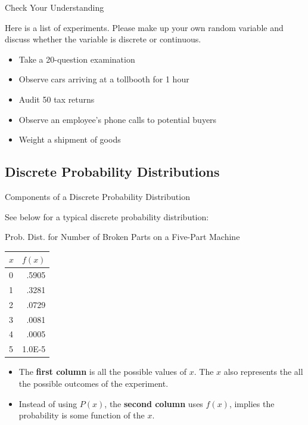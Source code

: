 \documentclass{beamer}
\begin{document}
\begin{frame}{Check Your Understanding}

Here is a list of experiments. Please make up your own random variable and discuss whether the variable is discrete or continuous. 

\begin{itemize}
\item Take a 20-question examination
\item Observe cars arriving at a tollbooth for 1 hour
\item Audit 50 tax returns
\item Observe an employee's phone calls to potential buyers
\item Weight a shipment of goods
\end{itemize}

\end{frame}


\subsection{Discrete Probability Distributions}

\begin{frame}
\subsectionpage
\end{frame}


\begin{frame}{Components of a Discrete Probability Distribution}

See below for a typical discrete probability distribution: 


\begin{center}
Prob. Dist. for Number of Broken Parts on a Five-Part Machine

\vspace{0.2 cm}
\begin{tabular}{l|r} 
\hline
$x$ & $f(x)$  \\ 
\hline
\hline
0     & .5905     \\ 
\hline
1     & .3281     \\ 
\hline
2     & .0729     \\ 
\hline
3     & .0081     \\ 
\hline
4     & .0005     \\ 
\hline
5     & 1.0E-5    \\
\hline
\end{tabular}
\end{center}

\begin{itemize}
\item The \textbf{first column} is all the possible values of $x$. The $x$ also represents the all the possible outcomes of the experiment. 
\item Instead of using $P(x)$, the \textbf{second column} uses $f(x)$, implies the probability is some function of the $x$. 
\end{itemize}


\end{frame}
\end{document}
